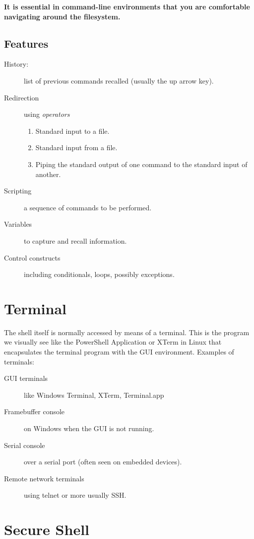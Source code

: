 \documentclass[slides]{pgnotes}
\begin{document}
\textbf{It is essential in command-line environments that you are comfortable navigating around the filesystem.}

\subsection{Features}

\begin{description}
\item[History:] list of previous commands recalled (usually the up arrow key).
\item[Redirection] using \textit{operators}
  \begin{enumerate}
  \item Standard input to a file.
  \item Standard input from a file.
  \item Piping the standard output of one command to the standard input of another.
  \end{enumerate}
\item[Scripting] a sequence of commands to be performed.
\item[Variables] to capture and recall information.
\item[Control constructs] including conditionals, loops, possibly exceptions.
\end{description}

\section{Terminal}

The shell itself is normally accessed by means of a terminal.
This is the program we visually see like the PowerShell Application or XTerm in Linux that encapsulates the terminal program with the GUI environment.
Examples of terminals:

\begin{description}
\item[GUI terminals ] like Windows Terminal, XTerm, Terminal.app
\item[Framebuffer console] on Windows when the GUI is not running.
\item[Serial console] over a serial port (often seen on embedded devices).
\item[Remote network terminals] using telnet or more usually SSH.
\end{description}

\section{Secure Shell}
\end{document}

